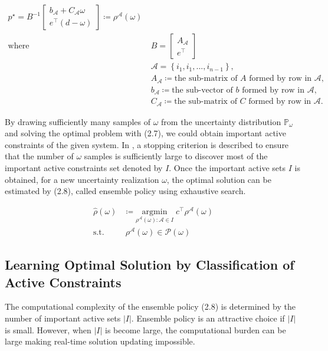 \documentclass[11pt]{article}
\begin{document}
\begin{align}\label{eq:opf_affine}
p^{\star}=B^{-1}\begin{bmatrix}
b_{\mathcal{A}}+C_{\mathcal{A}}\omega\\ 
e^{\top}\left(d-\omega\right)
\end{bmatrix} \coloneqq\rho^{\mathcal{A}}\left(\omega\right) \\
\text{where}
~ &~ B=\begin{bmatrix} A_{\mathcal{A}}\\ e^{\top} \end{bmatrix} \nonumber \\
~ &~ \mathcal{A} = \left \{ i_{1}, i_{1}, ..., i_{n-1} \right \}, \nonumber \\
~ &~ A_{\mathcal{A}} \coloneqq \text{the sub-matrix of } A \text{ formed by row in } \mathcal{A}, \nonumber \\
~ &~ b_{\mathcal{A}} \coloneqq \text{the sub-vector of } b \text{ formed by row in } \mathcal{A}, \nonumber \\
~ &~ C_{\mathcal{A}} \coloneqq \text{the sub-matrix of } C \text{ formed by row in } \mathcal{A}. \nonumber
\end{align}

By drawing sufficiently many samples of $\omega$ from the uncertainty distribution $\mathbb{P}_{\omega}$ and solving the optimal problem with (2.7), we could obtain important active constraints of the given system. In \cite{learing_constrained_op}, a stopping criterion is described to ensure that the number of $\omega$ samples is sufficiently large to discover most of the important active constraints set denoted by $I$.  Once the important active sets $I$ is obtained, for a new uncertainty realization $\omega$, the optimal solution can be estimated by (2.8), called ensemble policy using exhaustive search. 

\begin{align}\label{eq:ensemble_policy}
\hat{\rho}\left(\omega\right) & \coloneqq \underset{\rho^{\mathcal{A}}\left(\omega\right):\mathcal{A}\in I}{\mathrm{argmin}} \; c^{\top}\rho^{\mathcal{A}}\left(\omega\right) \\
\textrm{s.t.} 
~ &~ \rho^{\mathcal{A}}\left(\omega\right) \in \mathcal{P}\left(\omega\right) \nonumber
\end{align}


\subsection{Learning Optimal Solution by Classification of Active Constraints}
The computational complexity of the ensemble policy (2.8) is determined by the number of important active sets $\left| I \right|$. Ensemble policy is an attractive choice if $\left| I \right|$ is small. However, when $\left| I \right|$ is become large, the computational burden can be large making real-time solution updating impossible. 
\end{document}
